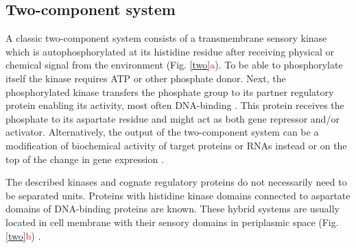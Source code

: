 \subsection{Two-component system}

A classic two-component system consists of a transmembrane sensory kinase which is autophosphorylated at its histidine residue after receiving physical or chemical signal from the environment (Fig. \ref{two}\textcolor{red}{a}).
To be able to phosphorylate itself the kinase requires ATP or other phosphate donor.
Next, the phosphorylated kinase transfers the phosphate group to its partner regulatory protein enabling its activity, most often DNA-binding \cite{lynch2012prioritization, gao2015temporal, cui2018novel}.
This protein receives the phosphate to its aspartate residue and might act as both gene repressor and/or activator.
Alternatively, the output of the two-component system can be a modification of biochemical activity of target proteins or RNAs instead or on the top of the change in gene expression \cite{shu2002antar, chambonnier2016hybrid}.

The described kinases and cognate regulatory proteins do not necessarily need to be separated units.
Proteins with histidine kinase domains connected to aspartate domains of DNA-binding proteins are known.
These hybrid systems are usually located in cell membrane with their sensory domains in periplasmic space (Fig. \ref{two}\textcolor{red}{b}) \cite{lynch2012prioritization, hirano2013regulon}.

